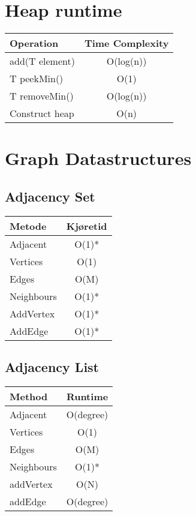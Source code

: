 \documentclass{article}
\begin{document}
\section{Heap runtime}
\begin{table}[h!]
\centering
\begin{tabular}{|l|c|}
\hline
\textbf{Operation} & \textbf{Time Complexity} \\
\hline
add(T element) & O(log(n)) \\
\hline
T peekMin() & O(1) \\
\hline
T removeMin() & O(log(n)) \\
\hline
Construct heap & O(n) \\
\hline
\end{tabular}
\end{table}

\section{Graph Datastructures}
\subsection{Adjacency Set}
\begin{table}[h!]
\centering
\begin{tabular}{|l|c|}
\hline
\textbf{Metode} & \textbf{Kjøretid} \\
\hline
Adjacent & O(1)* \\
\hline
Vertices & O(1) \\
\hline
Edges & O(M) \\
\hline
Neighbours & O(1)* \\
\hline
AddVertex & O(1)* \\
\hline
AddEdge & O(1)* \\
\hline
\end{tabular}
\end{table}



\subsection{Adjacency List}
\begin{table}[h!]
\centering
\begin{tabular}{|l|c|}
\hline
\textbf{Method} & \textbf{Runtime} \\
\hline
Adjacent & O(degree) \\
\hline
Vertices & O(1) \\
\hline
Edges & O(M) \\
\hline
Neighbours & O(1)* \\
\hline
addVertex & O(N) \\
\hline
addEdge & O(degree) \\
\hline
\end{tabular}
\end{table}
\end{document}
